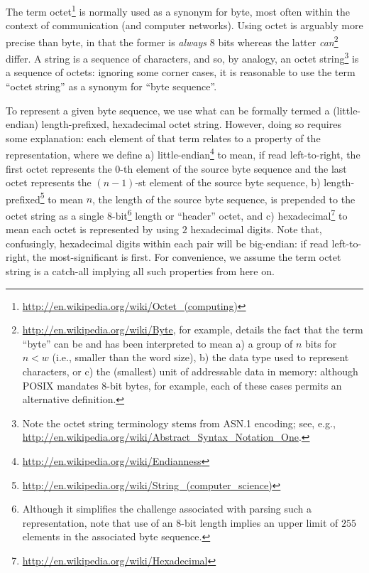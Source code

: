 The term octet\footnote{
\url{http://en.wikipedia.org/wiki/Octet_(computing)}
} is normally used as a synonym for byte, most often within the context
of communication (and computer networks).  Using octet is arguably more 
precise than byte, in that the former is {\em always} $8$ bits whereas
the latter {\em can}\footnote{
\url{http://en.wikipedia.org/wiki/Byte}, for example, details the fact
that the term ``byte'' can be and has been interpreted to mean
a) a group of $n$ bits for $n < w$ (i.e., smaller than the word size),
b) the data type used to represent characters,
   or
c) the (smallest) unit of addressable data in memory:
although POSIX mandates $8$-bit bytes, for example, each of these cases
permits an alternative definition.  
} differ.  A string is a sequence of characters, and so, by analogy, an
octet string\footnote{
Note the octet string terminology stems from ASN.1 encoding; see, e.g., 
\url{http://en.wikipedia.org/wiki/Abstract_Syntax_Notation_One}.
} is a sequence of octets: ignoring some corner cases, it is reasonable 
to use the term ``octet string'' as a synonym for ``byte sequence''.

To represent a given byte sequence, we use what can be formally termed
a (little-endian) length-prefixed, hexadecimal octet string.  However,
doing so requires some explanation: each element of that term relates
to a property of the representation, where we define
a) little-endian\footnote{
   \url{http://en.wikipedia.org/wiki/Endianness}
   } to mean, if read left-to-right,
   the first octet represents the     $0$-th element of the source byte sequence
   and
   the last  octet represents the $(n-1)$-st element of the source byte sequence,
b) length-prefixed\footnote{
   \url{http://en.wikipedia.org/wiki/String_(computer_science)}
   } to mean $n$, the length of the source byte sequence, is prepended 
   to the octet string as a single $8$-bit\footnote{
   Although it simplifies the challenge associated with parsing such a 
   representation, note that use of an $8$-bit length implies an upper 
   limit of $255$ elements in the associated byte sequence.
   } length or ``header'' octet,
   and
c) hexadecimal\footnote{
   \url{http://en.wikipedia.org/wiki/Hexadecimal}
   } to mean each octet is represented by using $2$ hexadecimal digits.  
   Note that, confusingly, hexadecimal digits within each pair will be
   big-endian: if read left-to-right, the most-significant is first.
For convenience, we assume the term octet string is a catch-all implying
all such properties from here on.

